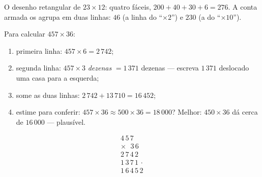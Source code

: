 \begin{omfigure}

{\small O desenho retangular de $23 \times 12$: quatro 
fáceis, $200 + 40 + 30 + 6 = 276$. A conta armada os agrupa em duas
linhas: $46$ (a linha do ``$\times 2$'') e $230$ (a do ``$\times
10$'').}
\end{omfigure}

\begin{method}\label{met:g4:mult:column}
Para calcular $457 \times 36$:
\begin{enumerate}
  \item primeira linha: $457 \times 6 = 2\,742$;
  \item segunda linha: $457 \times 3$ \emph{dezenas} $= 1\,371$
        dezenas --- escreva $1\,371$ deslocado uma casa para a
        esquerda;
  \item some as duas linhas: $2\,742 + 13\,710 = 16\,452$;
  \item estime para conferir: $457 \times 36 \approx 500 \times 36
        = 18\,000$? Melhor: $450 \times 36$ dá cerca de $16\,000$ ---
        plausível.
\end{enumerate}
\[
\begin{array}{r}
4\,5\,7 \\
\times\ \ \,3\,6 \\
\hline
2\,7\,4\,2 \\
1\,3\,7\,1\,\cdot \\
\hline
1\,6\,4\,5\,2
\end{array}
\]
\end{method}

